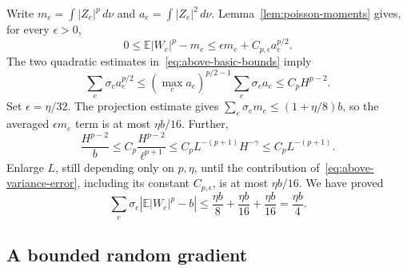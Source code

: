\documentclass[11pt]{article}
\newcommand{\E}{\mathbb E}
\theoremstyle{remark}
\numberwithin{equation}{section}
\begin{document}
Write
$m_e=\int|Z_e|^p\,d\nu$ and $a_e=\int|Z_e|^2\,d\nu$.
Lemma~\ref{lem:poisson-moments} gives, for every $\epsilon>0$,
\[
 0\le \E|W_e|^p-m_e
      \le \epsilon m_e+C_{p,\epsilon}a_e^{p/2}.
\]
The two quadratic estimates in~\eqref{eq:above-basic-bounds} imply
\begin{equation}
 \sum_e\sigma_e a_e^{p/2}
 \le \left(\max_e a_e\right)^{p/2-1}\sum_e\sigma_e a_e
 \le C_pH^{p-2}.
 \label{eq:above-variance-error}
\end{equation}
Set $\epsilon=\eta/32$. The projection estimate gives
$\sum_e\sigma_e m_e\le(1+\eta/8)b$, so the averaged
$\epsilon m_e$ term is at most $\eta b/16$. Further,
\[
 \frac{H^{p-2}}{b}
 \le C_p\frac{H^{p-2}}{\ell^{p+1}}
 \le C_pL^{-(p+1)}H^{-\gamma}
 \le C_pL^{-(p+1)}.
\]
Enlarge $L$, still depending only on $p,\eta$, until the contribution
of~\eqref{eq:above-variance-error}, including its constant
$C_{p,\epsilon}$, is at most $\eta b/16$. We have proved
\begin{equation}
 \sum_e\sigma_e\left|\E|W_e|^p-b\right|
   \le \frac{\eta b}{8}+\frac{\eta b}{16}
                         +\frac{\eta b}{16}
   =\frac{\eta b}{4}.
 \label{eq:above-poisson-error}
\end{equation}

\subsection{A bounded random gradient}
\end{document}
